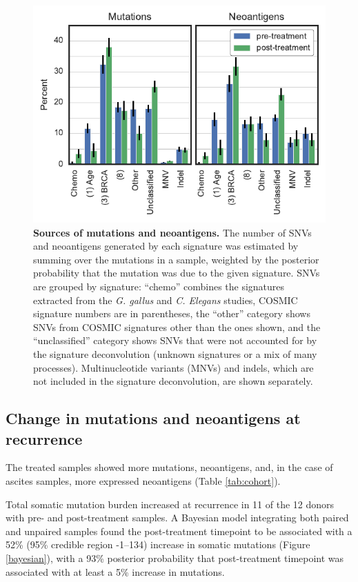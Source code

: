 \begin{figure}[htbp]
\centering
\includegraphics[scale=1.0]{figures/sources_of_mutations_and_neoantigens.pdf}
\caption{\textbf{Sources of mutations and neoantigens.} The number of SNVs and neoantigens generated by each signature was estimated by summing over the mutations in a sample, weighted by the posterior probability that the mutation was due to the given signature. SNVs are grouped by signature: ``chemo'' combines the signatures extracted from the \textit{G. gallus} and \textit{C. Elegans} studies, COSMIC signature numbers are in parentheses, the ``other'' category shows SNVs from COSMIC signatures other than the ones shown, and the ``unclassified'' category shows SNVs that were not accounted for by the signature deconvolution (unknown signatures or a mix of many processes). Multinucleotide variants (MNVs) and indels, which are not included in the signature deconvolution, are shown separately.}
\label{fig:sources}
\end{figure}


\subsection*{Change in mutations and neoantigens at recurrence}
The treated samples showed more mutations, neoantigens, and, in the case of ascites samples, more expressed neoantigens (Table \ref{tab:cohort}).

Total somatic mutation burden increased at recurrence in 11 of the 12 donors with pre- and post-treatment samples. A Bayesian model integrating both paired and unpaired samples found the post-treatment timepoint to be associated with a 52\% (95\% credible region -1--134) increase in somatic mutations (Figure \ref{bayesian}), with a 93\% posterior probability that post-treatment timepoint was associated with at least a 5\% increase in mutations. 


